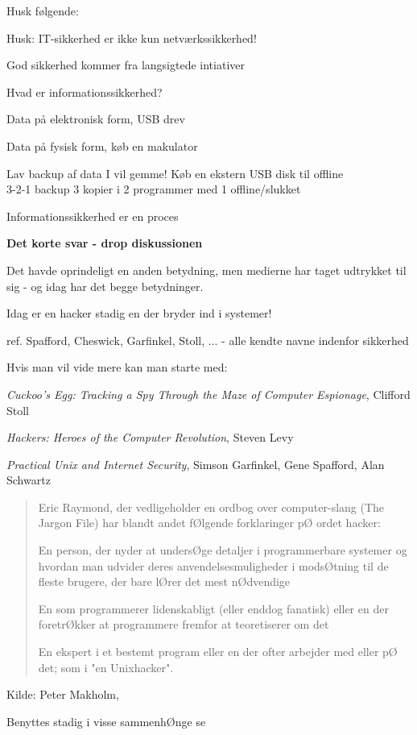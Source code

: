 \documentclass[20pt,landscape,a4paper]{foils}
\begin{document}

\begin{list1}
\item Husk følgende:
\begin{list2}
\item Husk: IT-sikkerhed er ikke kun netværkssikkerhed!
\item God sikkerhed kommer fra langsigtede intiativer
\item Hvad er informationssikkerhed?
\item Data på elektronisk form, USB drev
\item Data på fysisk form, køb en makulator
\item Lav backup af data I vil gemme! Køb en ekstern USB disk til offline\\
3-2-1 backup 3 kopier i 2 programmer med 1 offline/slukket
\end{list2}
\end{list1}
\vskip 1cm
\centerline{\color{titlecolor}\LARGE Informationssikkerhed er en proces}


\myquestionspage


{\bfseries Det korte svar - drop diskussionen}

Det havde oprindeligt en anden betydning, men medierne har taget
udtrykket til sig - og idag har det begge betydninger.

{\color{red}\hlkbig Idag er en hacker stadig en der bryder ind i systemer!}

ref. Spafford, Cheswick, Garfinkel, Stoll, ...
- alle kendte navne indenfor sikkerhed

Hvis man vil vide mere kan man starte med:
\begin{list2}
\item \emph{Cuckoo's Egg: Tracking a Spy Through the Maze of Computer
 Espionage},  Clifford Stoll
\item \emph{Hackers: Heroes of the Computer Revolution},
Steven Levy
\item \emph{Practical Unix and Internet Security},
Simson Garfinkel, Gene Spafford, Alan Schwartz
\end{list2}



\begin{quote}
Eric Raymond, der vedligeholder en ordbog over computer-slang (The Jargon File) har blandt andet fØlgende forklaringer pØ ordet hacker:
\begin{list2}
\item En person, der nyder at undersØge detaljer i programmerbare systemer og hvordan man udvider deres anvendelsesmuligheder i modsØtning til de fleste brugere, der bare lØrer det mest nØdvendige
\item En som programmerer lidenskabligt (eller enddog fanatisk) eller en der foretrØkker at programmere fremfor at teoretiserer om det
\item En ekspert i et bestemt program eller en der ofter arbejder med eller pØ det; som i "en Unixhacker".
\end{list2}
\end{quote}

\begin{list1}
\item Kilde: Peter Makholm, 
\item Benyttes stadig i visse sammenhØnge se 
\end{list1}
\end{document}
